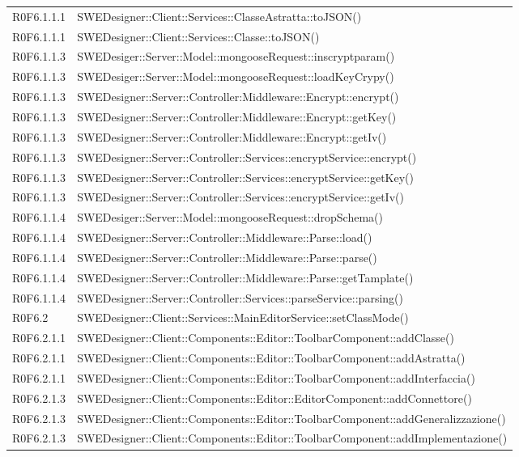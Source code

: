 \begin{center}
\begin{longtable}{p{2cm}!{\VRule[1pt]}p{13cm}}
R0F6.1.1.1 & SWEDesigner::Client::Services::ClasseAstratta::toJSON()\\
R0F6.1.1.1 & SWEDesigner::Client::Services::Classe::toJSON()\\
R0F6.1.1.3 & SWEDesiger::Server::Model::mongooseRequest::inscryptparam()\\
R0F6.1.1.3 & SWEDesiger::Server::Model::mongooseRequest::loadKeyCrypy()\\
R0F6.1.1.3 & SWEDesigner::Server::Controller:Middleware::Encrypt::encrypt()\\
R0F6.1.1.3 & SWEDesigner::Server::Controller:Middleware::Encrypt::getKey()\\
R0F6.1.1.3 & SWEDesigner::Server::Controller:Middleware::Encrypt::getIv()\\
R0F6.1.1.3 & SWEDesigner::Server::Controller::Services::encryptService::encrypt()\\
R0F6.1.1.3 & SWEDesigner::Server::Controller::Services::encryptService::getKey()\\
R0F6.1.1.3 & SWEDesigner::Server::Controller::Services::encryptService::getIv()\\
R0F6.1.1.4 & SWEDesiger::Server::Model::mongooseRequest::dropSchema()\\
R0F6.1.1.4 & SWEDesigner::Server::Controller::Middleware::Parse::load()\\
R0F6.1.1.4 & SWEDesigner::Server::Controller::Middleware::Parse::parse()\\
R0F6.1.1.4 & SWEDesigner::Server::Controller::Middleware::Parse::getTamplate()\\
R0F6.1.1.4 & SWEDesigner::Server::Controller::Services::parseService::parsing()\\
R0F6.2 & SWEDesigner::Client::Services::MainEditorService::setClassMode()\\
R0F6.2.1.1 & SWEDesigner::Client::Components::Editor::ToolbarComponent::addClasse()\\
R0F6.2.1.1 & SWEDesigner::Client::Components::Editor::ToolbarComponent::addAstratta()\\
R0F6.2.1.1 & SWEDesigner::Client::Components::Editor::ToolbarComponent::addInterfaccia()\\
R0F6.2.1.3 & SWEDesigner::Client::Components::Editor::EditorComponent::addConnettore()\\
R0F6.2.1.3 & SWEDesigner::Client::Components::Editor::ToolbarComponent::addGeneralizzazione()\\
R0F6.2.1.3 & SWEDesigner::Client::Components::Editor::ToolbarComponent::addImplementazione()\\

\end{longtable}
\end{center}
